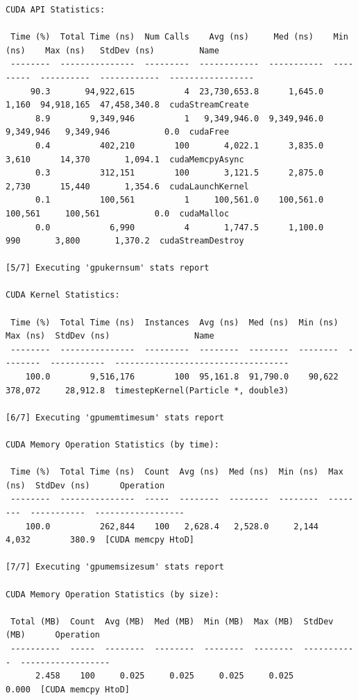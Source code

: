 \documentclass[english]{exam}
\begin{document}
\begin{lstlisting}
CUDA API Statistics:

 Time (%)  Total Time (ns)  Num Calls    Avg (ns)     Med (ns)    Min (ns)    Max (ns)   StdDev (ns)         Name       
 --------  ---------------  ---------  ------------  -----------  ---------  ----------  ------------  -----------------
     90.3       94,922,615          4  23,730,653.8      1,645.0      1,160  94,918,165  47,458,340.8  cudaStreamCreate 
      8.9        9,349,946          1   9,349,946.0  9,349,946.0  9,349,946   9,349,946           0.0  cudaFree         
      0.4          402,210        100       4,022.1      3,835.0      3,610      14,370       1,094.1  cudaMemcpyAsync  
      0.3          312,151        100       3,121.5      2,875.0      2,730      15,440       1,354.6  cudaLaunchKernel 
      0.1          100,561          1     100,561.0    100,561.0    100,561     100,561           0.0  cudaMalloc       
      0.0            6,990          4       1,747.5      1,100.0        990       3,800       1,370.2  cudaStreamDestroy

[5/7] Executing 'gpukernsum' stats report

CUDA Kernel Statistics:

 Time (%)  Total Time (ns)  Instances  Avg (ns)  Med (ns)  Min (ns)  Max (ns)  StdDev (ns)                 Name                
 --------  ---------------  ---------  --------  --------  --------  --------  -----------  -----------------------------------
    100.0        9,516,176        100  95,161.8  91,790.0    90,622   378,072     28,912.8  timestepKernel(Particle *, double3)

[6/7] Executing 'gpumemtimesum' stats report

CUDA Memory Operation Statistics (by time):

 Time (%)  Total Time (ns)  Count  Avg (ns)  Med (ns)  Min (ns)  Max (ns)  StdDev (ns)      Operation     
 --------  ---------------  -----  --------  --------  --------  --------  -----------  ------------------
    100.0          262,844    100   2,628.4   2,528.0     2,144     4,032        380.9  [CUDA memcpy HtoD]

[7/7] Executing 'gpumemsizesum' stats report

CUDA Memory Operation Statistics (by size):

 Total (MB)  Count  Avg (MB)  Med (MB)  Min (MB)  Max (MB)  StdDev (MB)      Operation     
 ----------  -----  --------  --------  --------  --------  -----------  ------------------
      2.458    100     0.025     0.025     0.025     0.025        0.000  [CUDA memcpy HtoD]  
\end{lstlisting}
\end{document}
